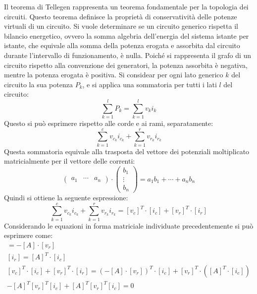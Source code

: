 \documentclass{article}
\numberwithin{equation}{subsection}
\begin{document}
Il teorema di Tellegen rappresenta un teorema fondamentale per la topologia dei circuiti. Questo teorema definisce la proprietà di conservatività delle potenze virtuali 
di un circuito. 
Si vuole determinare se un circuito generico rispetta il bilancio energetico, ovvero la somma algebria dell'energia del sistema istante per istante, che equivale alla 
somma della potenza erogata e assorbita dal circuito durante l'intervallo di funzionamento, è nulla. Poiché si rappresenta il grafo di un circuito rispetto alla convenzione 
dei generatori, la potenza assorbita è negativa, mentre la potenza erogata è positiva. 
Si considear per ogni lato generico $k$ del circuito la sua potenza $P_k$, e si applica una sommatoria per tutti i lati $l$ del circuito:
\begin{equation*}
    \displaystyle\sum_{k=1}^lP_k=\sum_{k=1}^lv_ki_k
\end{equation*}
Questo si può esprimere rispetto alle corde e ai rami, separatamente:
\begin{equation*}
    \displaystyle\sum_{k=1}^cv_{c_k}i_{c_k}+\sum_{k=1}^rv_{r_k}i_{r_k}
\end{equation*}
Questa sommatoria equivale alla trasposta del vettore dei potenziali moltiplicato matricialmente per il vettore delle correnti:
\begin{equation*}
    \begin{pmatrix}
        a_1&\cdots&a_n
    \end{pmatrix}\cdot\begin{pmatrix}
        b_1\\
        \vdots\\
        b_n
    \end{pmatrix}=a_1b_1+\cdots +a_nb_n
\end{equation*}
Quindi si ottiene la seguente espressione:
\begin{equation*}
    \displaystyle\sum_{k=1}^cv_{c_k}i_{c_k}+\sum_{k=1}^rv_{r_k}i_{r_k}=[v_c]^T\cdot[i_c]+[v_r]^T\cdot[i_r]    
\end{equation*}
Considerando le equazioni in forma matriciale individuate precedentemente si può esprimere come:
\begin{gather*}
    [v_c]=-[A]\cdot[v_r]\\
    [i_r]=[A]^T\cdot[i_c]\\
    [v_c]^T\cdot[i_c]+[v_r]^T\cdot[i_r]=\left(-[A]\cdot[v_r]\right)^T\cdot[i_c]+[v_r]^T\cdot\left([A]^T\cdot[i_c]\right)\\
    -[A]^T[v_r]^T[i_c]+[A]^T[v_r]^T[i_c]=0
\end{gather*}
\end{document}
